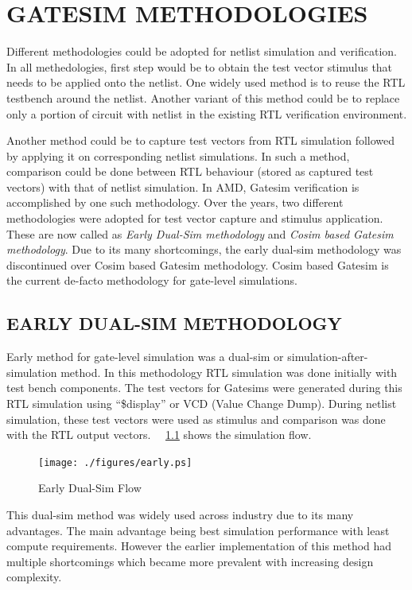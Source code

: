 \chapter{GATESIM METHODOLOGIES}
\label{chap:methodologies.tex}

Different methodologies could be adopted for netlist simulation and verification. In all methedologies, first step would be to obtain the test vector stimulus that needs to be applied onto the netlist. One widely used method is to reuse the RTL testbench around the netlist. Another variant of this method could be to replace only a portion of circuit with netlist in the existing RTL verification environment.

Another method could be to capture test vectors from RTL simulation followed by applying it on corresponding netlist simulations. In such a method, comparison could be done between RTL behaviour (stored as captured test vectors) with that of netlist simulation.  In AMD, Gatesim verification is accomplished by one such methodology. Over the years, two different methodologies were adopted for test vector capture and stimulus application. These are now called as {\it Early Dual-Sim methodology} and {\it Cosim based Gatesim methodology}. Due to its many shortcomings, the early dual-sim methodology was discontinued over Cosim based Gatesim methodology. Cosim based Gatesim is the current de-facto methodology for gate-level simulations.


\section{EARLY DUAL-SIM METHODOLOGY}
Early method for gate-level simulation was a dual-sim or simulation-after-simulation method. In this methodology RTL simulation was done initially with test bench components. The test vectors for Gatesims were generated during this RTL simulation using ``\$display'' or VCD (Value Change Dump). During netlist simulation, these test vectors were used as stimulus and comparison was done with the RTL output vectors. ~\figurename{~\ref{fig:early.ps}} shows the simulation flow. %

\begin{figure}[h]
\centering
\texttt{[image: ./figures/early.ps]}
\caption{Early Dual-Sim Flow}
\label{fig:early.ps}
\end{figure}

This dual-sim method was widely used across industry due to its many advantages. The main advantage being best simulation performance with least compute requirements. However the earlier implementation of this method had multiple shortcomings which became more prevalent with increasing design complexity.
